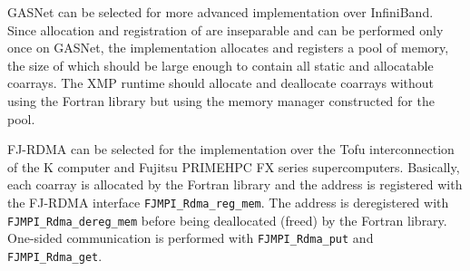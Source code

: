 GASNet can be selected for more advanced implementation over InfiniBand. 
Since allocation and registration of are inseparable and can be performed only once 
on GASNet, the implementation allocates and registers a pool of memory,
the size of which should be large enough to contain all static and allocatable coarrays.
The XMP runtime should allocate and deallocate coarrays without using the Fortran 
library but using the memory manager constructed for the pool.

FJ-RDMA can be selected for the implementation over the Tofu interconnection of 
the K computer and Fujitsu PRIMEHPC FX series supercomputers. 
Basically, each coarray is allocated by the Fortran library and 
the address is registered with the FJ-RDMA interface {\tt FJMPI\_Rdma\_reg\_mem}. 
The address is deregistered with {\tt FJMPI\_Rdma\_dereg\_mem} before being deallocated 
(freed) by the Fortran library. 
One-sided communication is performed with {\tt FJMPI\_Rdma\_put} and 
{\tt FJMPI\_Rdma\_get}.





